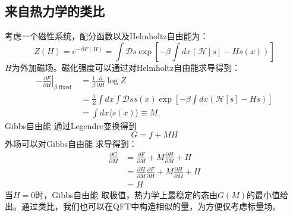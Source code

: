 \documentclass[10pt,openany]{book}
\theoremstyle{thmstyle} %
\theoremstyle{defstyle} %
\theoremstyle{prostyle} %
\begin{document}
\subsection{来自热力学的类比}
考虑一个磁性系统，配分函数以及Helmholtz自由能为：
\begin{equation}
  Z(H)=e^{-\beta F(H)}=\int \mathcal{D} s \exp \left[-\beta \int d x(\mathcal{H}[s]-H s(x))\right]
\end{equation}
$ H $为外加磁场。磁化强度可以通过对Helmholtz自由能求导得到：
\begin{equation*}
  \begin{aligned}
    -\left.\frac{\partial F}{\partial H}\right|_{\beta \text { fixed }} & =\frac{1}{\beta} \frac{\partial}{\partial H} \log Z \\
    & =\frac{1}{Z} \int d x \int \mathcal{D} s s(x) \exp \left[-\beta \int d x(\mathcal{H}[s]-H s)\right] \\
    & =\int d x\langle s(x)\rangle \equiv M .
    \end{aligned}
\end{equation*}
Gibbs自由能 通过Legendre变换得到
\begin{equation*}
  G=f+MH
\end{equation*}
外场可以对Gibbs自由能 求导得到：
\begin{equation}
  \begin{aligned}
    \frac{\partial G}{\partial M} & =\frac{\partial F}{\partial M}+M \frac{\partial H}{\partial M}+H \\
    & =\frac{\partial H}{\partial M} \frac{\partial F}{\partial H}+M \frac{\partial H}{\partial M}+H \\
    & =H
    \end{aligned}
\end{equation}
当$ H=0 $时，Gibbs自由能 取极值，热力学上最稳定的态由$ G(M) $的最小值给出。通过类比，我们也可以在QFT中构造相似的量，为方便仅考虑标量场。
\end{document}
